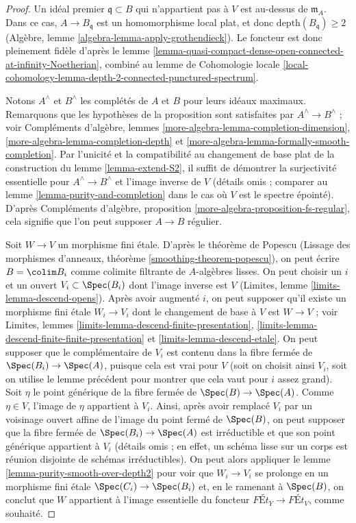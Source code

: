 \begin{proof}
Un idéal premier $\mathfrak q \subset B$ qui n'appartient pas à $V$
est au-dessus de $\mathfrak m_A$. Dans ce cas, $A \to B_\mathfrak q$
est un homomorphisme local plat, et donc $\text{depth}(B_\mathfrak q) \geq 2$
(Algèbre, lemme \ref{algebra-lemma-apply-grothendieck}).
Le foncteur est donc pleinement fidèle d'après le
lemme \ref{lemma-quasi-compact-dense-open-connected-at-infinity-Noetherian},
combiné au lemme de Cohomologie locale
\ref{local-cohomology-lemma-depth-2-connected-punctured-spectrum}.

\medskip\noindent
Notons $A^\wedge$ et $B^\wedge$ les complétés de $A$ et $B$
pour leurs idéaux maximaux. Remarquons que les hypothèses
de la proposition sont satisfaites par $A^\wedge \to B^\wedge$ ; voir
Compléments d'algèbre, lemmes
\ref{more-algebra-lemma-completion-dimension},
\ref{more-algebra-lemma-completion-depth} et
\ref{more-algebra-lemma-formally-smooth-completion}.
Par l'unicité et la compatibilité au changement de base plat
de la construction du lemme \ref{lemma-extend-S2},
il suffit de démontrer la surjectivité essentielle pour
$A^\wedge \to B^\wedge$ et l'image inverse de $V$
(détails omis ; comparer au lemme \ref{lemma-purity-and-completion}
dans le cas où $V$ est le spectre épointé).
D'après Compléments d'algèbre, proposition \ref{more-algebra-proposition-fs-regular},
cela signifie que l'on peut supposer $A \to B$ régulier.

\medskip\noindent
Soit $W \to V$ un morphisme fini étale.
D'après le théorème de Popescu
(Lissage des morphismes d'anneaux, théorème \ref{smoothing-theorem-popescu}),
on peut écrire $B = \colim B_i$ comme colimite filtrante
de $A$-algèbres lisses. On peut choisir un $i$ et un
ouvert $V_i \subset \Spec(B_i)$ dont l'image inverse est $V$
(Limites, lemme \ref{limits-lemma-descend-opens}).
Après avoir augmenté $i$, on peut supposer qu'il existe un morphisme
fini étale $W_i \to V_i$ dont le changement de base à $V$
est $W \to V$ ; voir
Limites, lemmes \ref{limits-lemma-descend-finite-presentation},
\ref{limits-lemma-descend-finite-finite-presentation} et
\ref{limits-lemma-descend-etale}.
On peut supposer que le complémentaire de $V_i$ est contenu
dans la fibre fermée de $\Spec(B_i) \to \Spec(A)$, puisque cela
est vrai pour $V$ (soit on choisit ainsi $V_i$, soit on utilise
le lemme précédent pour montrer que cela vaut pour $i$ assez grand).
Soit $\eta$ le point générique de la fibre fermée
de $\Spec(B) \to \Spec(A)$. Comme $\eta \in V$, l'image de
$\eta$ appartient à $V_i$. Ainsi, après avoir remplacé $V_i$ par un
voisinage ouvert affine de l'image du point fermé
de $\Spec(B)$, on peut supposer que la fibre fermée
de $\Spec(B_i) \to \Spec(A)$ est irréductible et que
son point générique appartient à $V_i$ (détails omis ; en effet,
un schéma lisse sur un corps est réunion disjointe de schémas irréductibles).
On peut alors appliquer le lemme \ref{lemma-purity-smooth-over-depth2}
pour voir que $W_i \to V_i$ se prolonge en un morphisme fini étale
$\Spec(C_i) \to \Spec(B_i)$ et, en le ramenant
à $\Spec(B)$, on conclut que $W$ appartient à
l'image essentielle du foncteur
$\textit{F\'Et}_Y \to \textit{F\'Et}_V$,
comme souhaité.
\end{proof}
